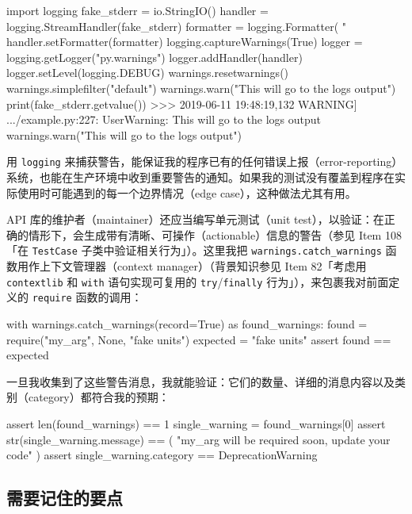 \begin{codebox}[python]
import logging
fake_stderr = io.StringIO()
handler = logging.StreamHandler(fake_stderr)
formatter = logging.Formatter(
    "%
handler.setFormatter(formatter)
logging.captureWarnings(True)
logger = logging.getLogger("py.warnings")
logger.addHandler(handler)
logger.setLevel(logging.DEBUG)
warnings.resetwarnings()
warnings.simplefilter("default")
warnings.warn("This will go to the logs output")
print(fake_stderr.getvalue())
>>>
2019-06-11 19:48:19,132 WARNING] .../example.py:227:
UserWarning: This will go to the logs output
  warnings.warn("This will go to the logs output")
\end{codebox}

用 \texttt{logging} 来捕获警告，能保证我的程序已有的任何错误上报（error-reporting）系统，也能在生产环境中收到重要警告的通知。如果我的测试没有覆盖到程序在实际使用时可能遇到的每一个边界情况（edge case），这种做法尤其有用。

API 库的维护者（maintainer）还应当编写单元测试（unit test），以验证：在正确的情形下，会生成带有清晰、可操作（actionable）信息的警告（参见 Item 108「在 \texttt{TestCase} 子类中验证相关行为」）。这里我把 \texttt{warnings.catch\_warnings} 函数用作上下文管理器（context manager）（背景知识参见 Item 82「考虑用 \texttt{contextlib} 和 \texttt{with} 语句实现可复用的 \texttt{try}/\texttt{finally} 行为」），来包裹我对前面定义的 \texttt{require} 函数的调用：

\begin{codebox}[python]
with warnings.catch_warnings(record=True) as found_warnings:
    found = require("my_arg", None, "fake units")
    expected = "fake units"
    assert found == expected
\end{codebox}

一旦我收集到了这些警告消息，我就能验证：它们的数量、详细的消息内容以及类别（category）都符合我的预期：

\begin{codebox}[python]
assert len(found_warnings) == 1
single_warning = found_warnings[0]
assert str(single_warning.message) == (
    "my_arg will be required soon, update your code"
)
assert single_warning.category == DeprecationWarning
\end{codebox}

\subsection{需要记住的要点}

